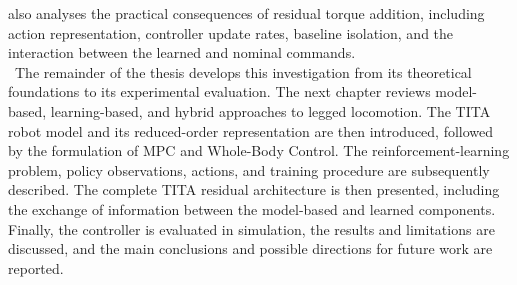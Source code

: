 also analyses the practical consequences of residual torque addition,
including action representation, controller update rates, baseline isolation,
and the interaction between the learned and nominal commands.\\
\
The remainder of the thesis develops this investigation from its theoretical
foundations to its experimental evaluation. The next chapter reviews
model-based, learning-based, and hybrid approaches to legged locomotion. The
TITA robot model and its reduced-order representation are then introduced,
followed by the formulation of MPC and Whole-Body Control.
The reinforcement-learning problem, policy observations, actions, and training
procedure are subsequently described. The complete TITA residual architecture
is then presented, including the exchange of information between the
model-based and learned components. Finally, the controller is evaluated in
simulation, the results and limitations are discussed, and the main conclusions
and possible directions for future work are reported.
